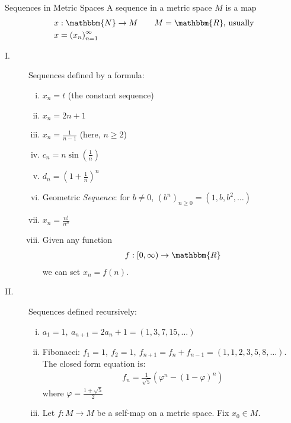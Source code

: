 \documentclass[10pt]{extarticle}
\newcommand{\N}{\mathbbm{N}}
\newcommand{\R}{\mathbbm{R}}
\begin{document}
  \begin{problem}{Sequences in Metric Spaces}
    A sequence in a metric space $M$ is a map
    \begin{align*}
      x&: \N \rightarrow M \tag*{$M = \R$, usually}\\
      x &= \left(x_n\right)_{n=1}^{\infty}
    \end{align*}
    \begin{description}
      \item[I.] Sequences defined by a formula:
        \begin{enumerate}[(i)]
          \item $x_n = t$ (the constant sequence)
          \item $x_n = 2n + 1$
          \item $x_n = \frac{1}{n-1}$ (here, $n \geq 2$)
          \item $c_n = n\sin\left(\frac{1}{n}\right)$
          \item $d_n = \left(1 + \frac{1}{n}\right)^n$
          \item Geometric \textsl{Sequence}: for $b\neq 0$, $(b^n)_{n\geq 0} = (1,b,b^2,\dots)$
          \item $x_n = \frac{n!}{n^n}$
          \item Given any function
            \begin{align*}
              f:[0,\infty)\rightarrow\R
            \end{align*}
            we can set $x_n = f(n)$.
        \end{enumerate}
      \item[II.] Sequences defined recursively:
        \begin{enumerate}[(i)]
          \item $a_1 = 1,~a_{n+1}=2a_n + 1 = (1,3,7,15,\dots)$
          \item Fibonacci: $f_1 = 1,~f_2 = 1,~f_{n+1} = f_{n} + f_{n-1} = (1,1,2,3,5,8,\dots)$. The closed form equation is:
            \begin{align*}
              f_n = \frac{1}{\sqrt{5}}\left(\varphi^n - (1-\varphi)^n\right)
            \end{align*}
            where $\varphi = \frac{1 + \sqrt{5}}{2}$
          \item Let $f: M\rightarrow M$ be a self-map on a metric space. Fix $x_0\in M$.\\


\end{enumerate}
\end{description}
\end{problem}
\end{document}
